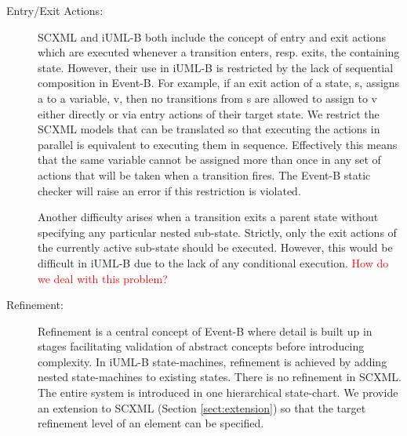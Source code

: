 \begin{description}
\item [Entry/Exit Actions:]
SCXML and iUML-B both include the concept of entry and exit actions which are executed whenever a transition enters, resp. exits, the containing state. 
However, their use in iUML-B is restricted by the lack of sequential composition in Event-B. 
For example, if an exit action of a state, s, assigns a to a variable, v, then no transitions from s are allowed to assign to v either directly or via entry actions of their target state.
We restrict the SCXML models that can be translated so that executing the actions in parallel is equivalent to executing them in sequence.
Effectively this means that the same variable cannot be assigned more than once in any set of actions that will be taken when a transition fires. 
The Event-B static checker will raise an error if this restriction is violated.

Another difficulty arises when a transition exits a parent state without specifying any particular nested sub-state. 
Strictly, only the exit actions of the currently active sub-state should be executed. However, this would be difficult in iUML-B due to the lack of any conditional execution.
\textcolor{red} {How do we deal with this problem? }

\item [Refinement:]
Refinement is a central concept of Event-B where detail is built up in stages facilitating validation of abstract concepts before introducing complexity. 
In iUML-B state-machines, refinement is achieved by adding nested state-machines to existing states.
There is no refinement in SCXML. The entire system is introduced in one hierarchical state-chart. We provide an extension to SCXML (Section \ref{sect:extension}) so that the target refinement level of an element can be specified.

\end{description}


%
%

